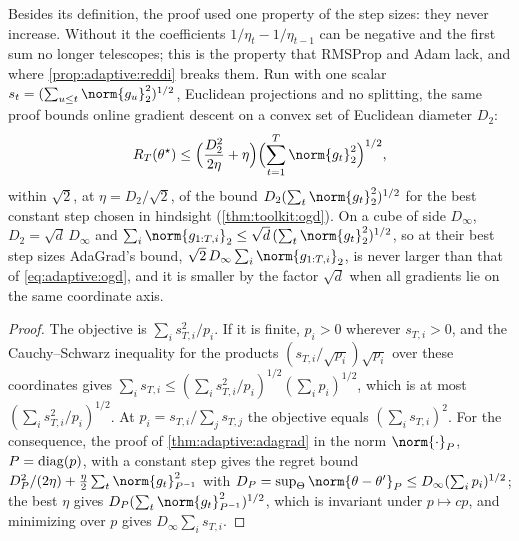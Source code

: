 \begin{refsection}
Besides its definition, the proof used one property of the step sizes: they never increase. Without it the coefficients $1/\eta_t-1/\eta_{t-1}$ can be negative and the first sum no longer telescopes; this is the property that RMSProp and Adam lack, and where \cref{prop:adaptive:reddi} breaks them. Run with one scalar $s_t=(\sum_{u\le t}\norm{g_u}_2^2)^{1/2}$, Euclidean projections and no splitting, the same proof bounds online gradient descent on a convex set of Euclidean diameter $D_2$:
\begin{equation}\label{eq:adaptive:ogd}
  R_T(\theta^\star)\le\Bigl(\frac{D_2^2}{2\eta}+\eta\Bigr)\Bigl(\sum_{t=1}^T\norm{g_t}_2^2\Bigr)^{1/2},
\end{equation}
within $\sqrt2$, at $\eta=D_2/\sqrt2$, of the bound $D_2(\sum_t\norm{g_t}_2^2)^{1/2}$ for the best constant step chosen in hindsight (\cref{thm:toolkit:ogd}). On a cube of side $D_\infty$, $D_2=\sqrt d\,D_\infty$ and $\sum_i\norm{g_{1:T,i}}_2\le\sqrt d\,(\sum_t\norm{g_t}_2^2)^{1/2}$, so at their best step sizes AdaGrad's bound, $\sqrt2\,D_\infty\sum_i\norm{g_{1:T,i}}_2$, is never larger than that of \eqref{eq:adaptive:ogd}, and it is smaller by the factor $\sqrt d$ when all gradients lie on the same coordinate axis.


\begin{proof}
The objective is $\sum_is_{T,i}^2/p_i$. If it is finite, $p_i>0$ wherever $s_{T,i}>0$, and the Cauchy--Schwarz inequality for the products $(s_{T,i}/\sqrt{p_i})\sqrt{p_i}$ over these coordinates gives $\sum_is_{T,i}\le(\sum_is_{T,i}^2/p_i)^{1/2}(\sum_ip_i)^{1/2}$, which is at most $(\sum_is_{T,i}^2/p_i)^{1/2}$. At $p_i=s_{T,i}/\sum_js_{T,j}$ the objective equals $(\sum_is_{T,i})^2$. For the consequence, the proof of \cref{thm:adaptive:adagrad} in the norm $\norm{\cdot}_P$, $P=\operatorname{diag}(p)$, with a constant step gives the regret bound $D_P^2/(2\eta)+\frac\eta2\sum_t\norm{g_t}^2_{P^{-1}}$ with $D_P=\sup_{\Theta}\norm{\theta-\theta'}_P\le D_\infty(\sum_ip_i)^{1/2}$; the best $\eta$ gives $D_P(\sum_t\norm{g_t}^2_{P^{-1}})^{1/2}$, which is invariant under $p\mapsto cp$, and minimizing over $p$ gives $D_\infty\sum_is_{T,i}$.
\end{proof}


\end{refsection}
